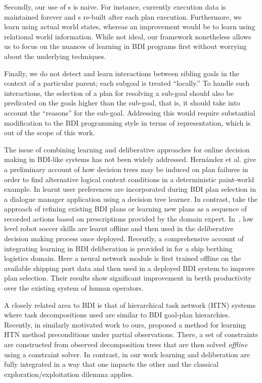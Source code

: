 Secondly, our use of \dt s is naive. 
For instance, currently execution data is maintained forever and 
\dt s re-built after each plan execution. Furthermore, we learn using actual 
world states, whereas an improvement would be to learn using relational world information.
While not ideal, our framework nonetheless allows us to focus on 
the nuances of learning in BDI programs first 
without worrying about the underlying techniques.

Finally, we do not detect and learn interactions between
sibling goals in the context of a particular parent; each
subgoal is treated ``locally.'' To handle such interactions, the
selection of a plan for resolving a sub-goal should also be predicated
on the goals higher than the sub-goal, that is, it should take into
account the ``reasons'' for the sub-goal. Addressing this would require substantial modification to the BDI programming style in terms of representation, which is out of the scope of this work.

The issue of combining learning and deliberative approaches for online 
decision making in BDI-like systems has not been widely addressed.
%
Hern\'andez et al. \cite{Hernandez04:Learning} give a preliminary
account of how decision trees may be induced on plan failures in order
to find alternative logical context conditions in a deterministic
paint-world example. 
%
In \cite{nguyen2006an-ad} learnt user preferences are incorporated during BDI plan selection in a dialogue manager application using a decision tree learner. %
In contrast, \cite{karim2006plans} take the approach of refining existing BDI plans or learning new plans as a sequence of recorded actions based on prescriptions provided by the domain expert.
%
In~\cite{Riedmiller01}, low level robot soccer skills are learnt offline and then used in the deliberative decision making process once deployed.
%
Recently, a comprehensive account of integrating learning in BDI deliberation is provided in \cite{lokuge2007impro} for a ship berthing logistics domain. Here a neural network module is first trained offline on the available shipping port data and then used in a deployed BDI system to improve plan selection. Their results show significant improvement in berth productivity over the existing system of human operators.

A closely related area to BDI is that of hierarchical task network (HTN)
systems where task decompositions used are similar to BDI goal-plan hierarchies.
Recently, in similarly motivated work to ours, \cite{Zhuo09:Learning} 
proposed a method for learning HTN method preconditions under partial
observations. There, a set of constraints are constructed from
observed decomposition trees that are then solved \emph{offline} using
a constraint solver.
%
In contrast, in our work learning and deliberation are fully integrated in a
way that one impacts the other and the classical
exploration/exploitation dilemma applies. 

